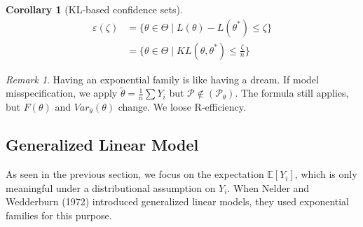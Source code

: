 \documentclass[a4paper,12pt, oneside, fleqn]{book}
\newtheorem{corollary}{Corollary}[theorem]
\theoremstyle{definition}
\theoremstyle{remark}
\newtheorem*{remark}{Remark}
\begin{document}
\begin{corollary}[KL-based confidence sets]
	\begin{align*}
		\varepsilon(\zeta) &= \{ \theta \in \Theta \mid L(\theta) - L(\theta^*) \leq \zeta \}\\
		&= \{\theta \in \Theta \mid KL(\theta, \theta^*) \leq \frac{\zeta}{n} \}
	\end{align*}
\end{corollary}


\begin{remark}
Having an exponential family is like having a dream.
If model misspecification, we apply $\tilde{\theta} = \frac{1}{n} \sum Y_i$ but $\mathcal{P} \notin (\mathcal{P}_\theta)$. The formula still applies, but $F(\theta)$ and $Var_\theta(\theta)$ change. We loose R-efficiency.	
\end{remark}

\subsection{Generalized Linear Model}

As seen in the previous section, we focus on the expectation $\mathbb{E}[Y_i]$, which is only meaningful under a distributional assumption on $Y_i$. When Nelder and Wedderburn (1972) introduced generalized linear models, they used exponential families for this purpose.
\end{document}
